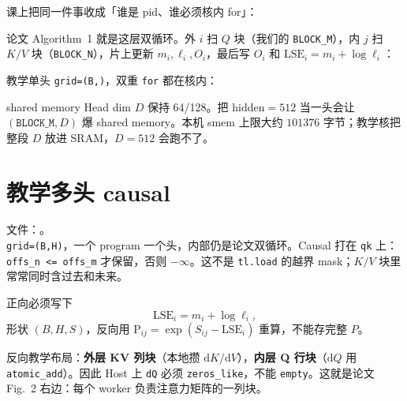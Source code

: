 
课上把同一件事收成「谁是 pid、谁必须核内 for」：

\figflashloop

论文 Algorithm~1 就是这层双循环。外 $i$ 扫 $Q$ 块（我们的 \texttt{BLOCK\_M}），内 $j$ 扫 $K/V$ 块（\texttt{BLOCK\_N}），片上更新 $m_i,\ell_i,O_i$，最后写 $O_i$ 和 $\mathrm{LSE}_i=m_i+\log\ell_i$：


教学单头 \texttt{grid=(B,)}，双重 \texttt{for} 都在核内：


\begin{proposition}{shared memory}
Head dim $D$ 保持 64/128。把 hidden$=512$ 当一头会让 $(\texttt{BLOCK\_M},D)$ 爆 shared memory。本机 smem 上限大约 $101376$ 字节；教学核把整段 $D$ 放进 SRAM，$D=512$ 会跑不了。
\end{proposition}

\section{教学多头 causal}

文件：。\\
\texttt{grid=(B,H)}，一个 program 一个头，内部仍是论文双循环。Causal 打在 \texttt{qk} 上：\texttt{offs\_n <= offs\_m} 才保留，否则 $-\infty$。这不是 \texttt{tl.load} 的越界 mask；$K/V$ 块里常常同时含过去和未来。

\figcausal

正向必须写下
\[
\mathrm{LSE}_i=m_i+\log \ell_i,
\]
形状 $(B,H,S)$，反向用 $\mathrm{P}_{ij}=\exp(S_{ij}-\mathrm{LSE}_i)$ 重算，不能存完整 $P$。

反向教学布局：\textbf{外层 KV 列块}（本地攒 $\mathrm{d}K/\mathrm{d}V$），\textbf{内层 Q 行块}（$\mathrm{d}Q$ 用 \texttt{atomic\_add}）。因此 Host 上 \texttt{dQ} 必须 \texttt{zeros\_like}，不能 \texttt{empty}。这就是论文 Fig.~2 右边：每个 worker 负责注意力矩阵的一列块。


